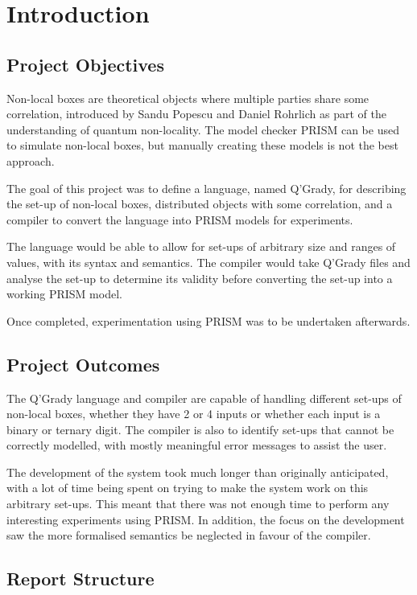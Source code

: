 \documentclass[report.tex]{subfiles}
\begin{document}
\chapter{Introduction} %
\label{cha:introduction}
\section{Project Objectives} %
\label{sec:project_objectives}
Non-local boxes are theoretical objects where multiple parties share some
correlation, introduced by Sandu Popescu and Daniel Rohrlich as part of the
understanding of quantum non-locality. The model checker PRISM can be used to
simulate non-local boxes, but manually creating these models is not the best
approach.

The goal of this project was to define a language, named Q'Grady, for describing
the set-up of non-local boxes, distributed objects with some correlation, and a
compiler to convert the language into PRISM models for experiments.

The language would be able to allow for set-ups of arbitrary size and ranges of
values, with its syntax and semantics. The compiler would take Q'Grady files and
analyse the set-up to determine its validity before converting the set-up into a
working PRISM model.

Once completed, experimentation using PRISM was to be undertaken afterwards.
\section{Project Outcomes} %
\label{sec:project_outcomes}
The Q'Grady language and compiler are capable of handling different set-ups of
non-local boxes, whether they have 2 or 4 inputs or whether each input is a
binary or ternary digit. The compiler is also to identify set-ups that cannot be
correctly modelled, with mostly meaningful error messages to assist the user.

The development of the system took much longer than originally anticipated, with
a lot of time being spent on trying to make the system work on this arbitrary
set-ups. This meant that there was not enough time to perform any interesting
experiments using PRISM. In addition, the focus on the development saw the
more formalised semantics be neglected in favour of the compiler.
\section{Report Structure} %
\label{sec:report_structure}

\newpage
\end{document}
